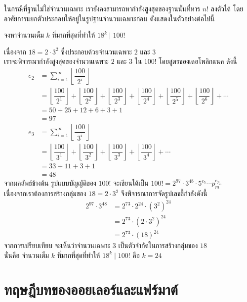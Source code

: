 \newpage
ในกรณีที่ฐานไม่ใช่จำนวนเฉพาะ เรายังคงสามารถหากำลังสูงสุดของฐานนั้นที่หาร $n!$ ลงตัวได้ โดยอาศัยการแยกตัวประกอบให้อยู่ในรูปฐานจำนวนเฉพาะก่อน ดังแสดงในตัวอย่างต่อไปนี้ 
\begin{examplebox}
	จงหาจำนวนเต็ม $k$ ที่มากที่สุดที่ทำให้ $18^k \mid 100!$ 
\end{examplebox}
\solution เนื่องจาก $18 = 2 \cdot 3^2$ ซึ่งประกอบด้วยจำนวนเฉพาะ $2$ และ $3$ \\
เราจะพิจารณากำลังสูงสุดของจำนวนเฉพาะ $2$ และ $3$ ใน $100!$ โดยสูตรของเดอโพลิกแนค ดังนี้
\begin{align*}
	e_2 &= \sum_{i=1}^{\infty} \left\lfloor \dfrac{100}{2^i} \right\rfloor \\
	&= \left\lfloor \dfrac{100}{2^1} \right\rfloor + \left\lfloor \dfrac{100}{2^2} \right\rfloor + \left\lfloor \dfrac{100}{2^3} \right\rfloor + \left\lfloor \dfrac{100}{2^4} \right\rfloor + \left\lfloor \dfrac{100}{2^5} \right\rfloor + \left\lfloor \dfrac{100}{2^6} \right\rfloor + \cdots \\
	&= 50 + 25 + 12 + 6 + 3 + 1 \\
	&= 97 \\[0.8em]
	e_3 &= \sum_{i=1}^{\infty} \left\lfloor \dfrac{100}{3^i} \right\rfloor \\
	&= \left\lfloor \dfrac{100}{3^1} \right\rfloor + \left\lfloor \dfrac{100}{3^2} \right\rfloor + \left\lfloor \dfrac{100}{3^3} \right\rfloor + \left\lfloor \dfrac{100}{3^4} \right\rfloor + \cdots \\
	&= 33 + 11 + 3 + 1 \\
	&= 48
\end{align*}
จากผลลัพธ์ข้างต้น รูปแบบบัญญัติของ $100!$ จะเขียนได้เป็น $100! = 2^{97} \cdot 3^{48} \cdot 5^{e_5} \cdots p_m^{e_{p_m}}$ \\
เนื่องจากเราต้องการสร้างกลุ่มของ $18 = 2 \cdot 3^2$ จึงพิจารณาการจัดรูปเลขชี้กำลังดังนี้
\begin{align*}
	2^{97} \cdot 3^{48} &= 2^{73} \cdot 2^{24} \cdot (3^2)^{24} \\
	&= 2^{73} \cdot (2 \cdot 3^2)^{24} \\
	&= 2^{73} \cdot (18)^{24}
\end{align*}
จากการเปรียบเทียบ จะเห็นว่าจำนวนเฉพาะ $3$ เป็นตัวจำกัดในการสร้างกลุ่มของ $18$ \\
นั่นคือ จำนวนเต็ม $k$ ที่มากที่สุดที่ทำให้ $18^k \mid 100!$ คือ $k = 24$ 

\newpage
\section{ทฤษฎีบทของออยเลอร์และแฟร์มาต์}


